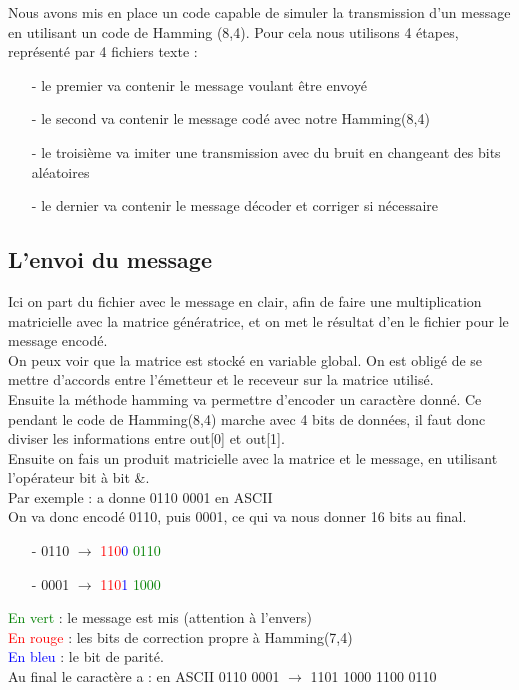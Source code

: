 \documentclass[12pt]{article}
\begin{document}
Nous avons mis en place un code capable de simuler la transmission d’un message en utilisant un code de Hamming (8,4).
Pour cela nous utilisons 4 étapes, représenté par 4 fichiers texte :

\begin{enumerate}
  \item[-] le premier va contenir le message voulant être envoyé
  \item[-] le second va contenir le message codé avec notre Hamming(8,4)
  \item[-] le troisième va imiter une transmission avec du bruit en changeant des bits aléatoires
  \item[-] le dernier va contenir le message décoder et corriger si nécessaire
\end{enumerate}


\subsection{L'envoi du message}
\label{sub:L'envoi du message}

Ici on part du fichier avec le message en clair, afin de faire une multiplication matricielle avec la matrice génératrice, et on met le résultat d’en le fichier pour le message encodé.\\

On peux voir que la matrice est stocké en variable global. On est obligé de se mettre d’accords entre l'émetteur et le receveur sur la matrice utilisé.\\

Ensuite la méthode hamming va permettre d’encoder un caractère donné. Ce pendant le code de Hamming(8,4) marche avec 4 bits de données, il faut donc diviser les informations entre out[0] et out[1].\\
Ensuite on fais un produit matricielle avec la matrice et le message, en utilisant l’opérateur bit à bit \&.\\
Par exemple : a donne 0110 0001 en ASCII\\
On va donc encodé 0110, puis 0001, ce qui va nous donner 16 bits au final.\\

\begin{enumerate}
  \item[-] 0110 $\rightarrow$ \textcolor{red}{110}\textcolor{blue}{0 }\textcolor{green}{0110}
  \item[-] 0001 $\rightarrow$ \textcolor{red}{110}\textcolor{blue}{1 }\textcolor{green}{1000}
\end{enumerate}
\textcolor{green}{En vert} : le message est mis (attention à l’envers)\\
\textcolor{red}{En rouge} : les bits de correction propre à Hamming(7,4)\\
\textcolor{blue}{En bleu} : le bit de parité.\\
Au final le caractère a : en ASCII 0110 0001 $\rightarrow$ 1101 1000 1100 0110
\end{document}
